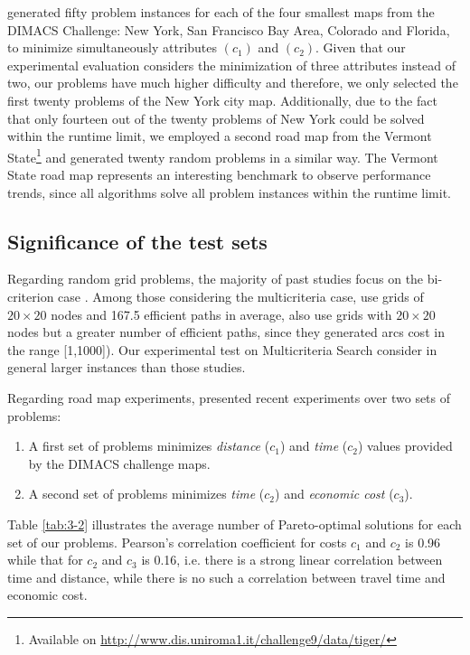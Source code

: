 \citet{Machuca2011b} generated fifty problem instances for each of the four smallest maps from the DIMACS Challenge: New York, San Francisco Bay Area, Colorado and Florida, to minimize simultaneously attributes $(c_1)$ and $(c_2)$. Given that our experimental evaluation considers the minimization of three attributes instead of two, our problems have much higher difficulty and therefore, we only selected the first twenty problems of the New York city map. Additionally, due to the fact that only fourteen out of the twenty problems of New York could be solved within the runtime limit, we employed a second road map from the Vermont State\footnote{Available on \url{http://www.dis.uniroma1.it/challenge9/data/tiger/}} and generated twenty random problems in a similar way. The Vermont State road map represents an interesting benchmark to observe performance trends, since all algorithms solve all problem instances within the runtime limit. 

\subsection{Significance of the test sets}
\label{chapMultiObjTestBeds:sec:significanceGrids}

Regarding random grid problems, the majority of past studies focus on the bi-criterion case \citep{Raith2009, Machuca2012a}. Among those considering the multicriteria case, \citet{caramiaetal2010} use grids of $20 \times 20$ nodes and 167.5 efficient paths in average, \citet{martinsetal2007,Paixao2007} also use grids with $20 \times 20$ nodes but a greater number of efficient paths, since they generated arcs cost in the range [1,1000]). Our experimental test on Multicriteria Search consider in general larger instances than those studies.

Regarding road map experiments, \citet{Machuca2012a} presented recent experiments over two sets of problems: 
\begin{enumerate}
	\item A first set of problems minimizes \textit{distance} ($c_1$) and \textit{time} ($c_2$) values provided by the DIMACS challenge maps.
	\item A second set of problems minimizes \textit{time} ($c_2$) and \textit{economic cost} ($c_3$). 	
\end{enumerate}

Table \ref{tab:3-2} illustrates the average number of Pareto-optimal solutions for each set of our problems. Pearson's correlation coefficient for costs $c_1$ and $c_2$ is 0.96 while that for $c_2$ and $c_3$ is 0.16, i.e. there is a strong linear correlation between time and distance, while there is no such a correlation between travel time and economic cost. 

